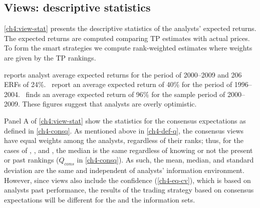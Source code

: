 \documentclass[12pt,a4paper]{article}\usepackage[]{graphicx}\usepackage[]{color}
\begin{document}

\subsection{Views: descriptive statistics}


\ref{ch4:view-stat} presents the descriptive statistics of the analysts' expected returns. The expected returns  are computed comparing TP estimates with actual prices. To form the smart strategies we compute rank-weighted estimates where weights are given  by the TP rankings.

\cite{bradshaw2002} reports analyst average expected returns for the period of 2000--2009 and 206 ERFs of 24\%.~\cite{da2011} report an average expected return of 40\% for the period of 1996--2004.~\cite{zhou2013} finds an average expected return of 96\% for the sample period of 2000--2009. These figures suggest that analysts are overly optimistic.

Panel A of \ref{ch4:view-stat} show the statistics for the consensus expectations as defined in \ref{ch4-consq}. As mentioned above in \ref{ch4-def-q}, the consensus views have equal weights among the analysts, regardless of their ranks; thus, for the cases of \tr{}, \naive{}, and , the median is the same regardless of knowing or not the present or past rankings ($Q_{cons}$ in  \ref{ch4-consq}). As such, the mean, median, and standard deviation are the same and independent of analysts' information environment. However, since views also include the confidence (\ref{ch4-eq-cv}), which is based on analysts past performance, the results of the trading strategy based on consensus expectations will be different for the \naive{} and the  information sets.


\end{document}
